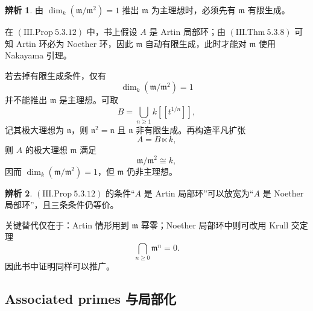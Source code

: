 \documentclass[a4paper]{ctexart}
\theoremstyle{definition}
\theoremstyle{analysis}
\newtheorem{remark}{辨析}[section]
\theoremstyle{plain}
\begin{document}
\begin{remark}
\label{rem:prop5312-nakayama}
由 \(\dim_k(\mathfrak m/\mathfrak m^2)=1\) 推出 \(\mathfrak m\) 为主理想时，必须先有 \(\mathfrak m\) 有限生成。

在 \((\mathrm{III.Prop}\ 5.3.12)\) 中，书上假设 \(A\) 是 Artin 局部环；由 \((\mathrm{III.Thm}\ 5.3.8)\) 可知 Artin 环必为 Noether 环，因此 \(\mathfrak m\) 自动有限生成，此时才能对 \(\mathfrak m\) 使用 Nakayama 引理。

若去掉有限生成条件，仅有
\[
  \dim_k(\mathfrak m/\mathfrak m^2)=1
\]
并不能推出 \(\mathfrak m\) 是主理想。可取
\[
  B=\bigcup_{n\ge 1} k[[t^{1/n}]],
\]
记其极大理想为 \(\mathfrak n\)，则 \(\mathfrak n^2=\mathfrak n\) 且 \(\mathfrak n\) 非有限生成。再构造平凡扩张
\[
  A=B\ltimes k,
\]
则 \(A\) 的极大理想 \(\mathfrak m\) 满足
\[
  \mathfrak m/\mathfrak m^2\cong k,
\]
因而 \(\dim_k(\mathfrak m/\mathfrak m^2)=1\)，但 \(\mathfrak m\) 仍非主理想。
\end{remark}

\begin{remark}
\label{rem:prop5312-noether}
\((\mathrm{III.Prop}\ 5.3.12)\) 的条件“\(A\) 是 Artin 局部环”可以放宽为“\(A\) 是 Noether 局部环”，且三条条件仍等价。

关键替代仅在于：Artin 情形用到 \(\mathfrak m\) 幂零；Noether 局部环中则可改用 Krull 交定理
\[
  \bigcap_{n\ge 0}\mathfrak m^n=0.
\]
因此书中证明同样可以推广。
\end{remark}

\subsection{Associated primes 与局部化}\label{subsec:ass-localization}
\end{document}
